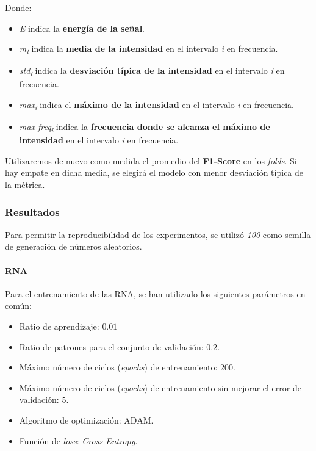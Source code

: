 \documentclass[12pt]{article}
\begin{document}
\newpage
\hphantom{skip}

Donde:
\begin{itemize}
	\item \textit{E} indica la \textbf{energía de la señal}.
	\item \textit{m\textsubscript{i}} indica la \textbf{media de la intensidad} en el intervalo \textit{i} en frecuencia.
	\item \textit{std\textsubscript{i}} indica la \textbf{desviación típica de la intensidad} en el intervalo \textit{i} en frecuencia.
	\item \textit{max\textsubscript{i}} indica el \textbf{máximo de la intensidad} en el intervalo \textit{i} en frecuencia.
	\item \textit{max-freq\textsubscript{i}} indica la \textbf{frecuencia donde se alcanza el máximo de intensidad} en el intervalo \textit{i} en frecuencia.
\end{itemize}

\bigskip
Utilizaremos de nuevo como medida el promedio del \textbf{F1-Score} en los \textit{folds}. Si hay empate en dicha media, se elegirá el modelo con menor
desviación típica de la métrica.

\subsubsection{Resultados}
Para permitir la reproducibilidad de los experimentos, se utilizó \textit{100} como semilla de generación de números
aleatorios.

\paragraph{RNA}

Para el entrenamiento de las RNA, se han utilizado los siguientes parámetros en común:
\begin{itemize}
	\item Ratio de aprendizaje: $0.01$
	\item Ratio de patrones para el conjunto de validación: $0.2$.
	\item Máximo número de ciclos (\textit{epochs}) de entrenamiento: $200$.
	\item Máximo número de ciclos (\textit{epochs}) de entrenamiento sin mejorar el error de validación: $5$.
	\item Algoritmo de optimización: ADAM.
	\item Función de \textit{loss}: \textit{Cross Entropy}.
\end{itemize}
\end{document}
